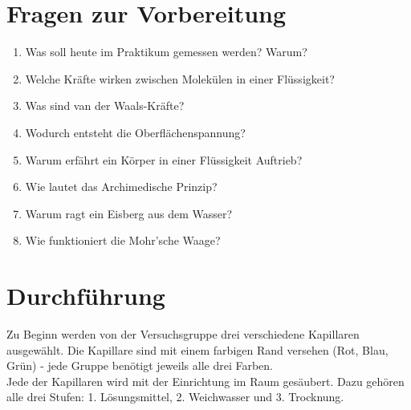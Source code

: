 \section{Fragen zur Vorbereitung}

\begin{enumerate} 
 \item Was soll heute im Praktikum gemessen werden? Warum?
 \item Welche Kräfte wirken zwischen Molekülen in einer Flüssigkeit?
 \item Was sind van der Waals-Kräfte?
 \item Wodurch entsteht die Oberflächenspannung?
 \item Warum erfährt ein Körper in einer Flüssigkeit Auftrieb?
 \item Wie lautet das Archimedische Prinzip?
 \item Warum ragt ein Eisberg aus dem Wasser?
 \item Wie funktioniert die Mohr'sche Waage?
\end{enumerate} 

\section{Durchführung} 

Zu Beginn werden von der Versuchsgruppe drei verschiedene Kapillaren ausgewählt. Die Kapillare sind mit einem farbigen Rand versehen (Rot, Blau, Grün) - jede Gruppe benötigt jeweils alle drei Farben.\\

Jede der Kapillaren wird mit der Einrichtung im Raum gesäubert. Dazu gehören alle drei Stufen: 1. Lösungsmittel, 2. Weichwasser und 3. Trocknung.

